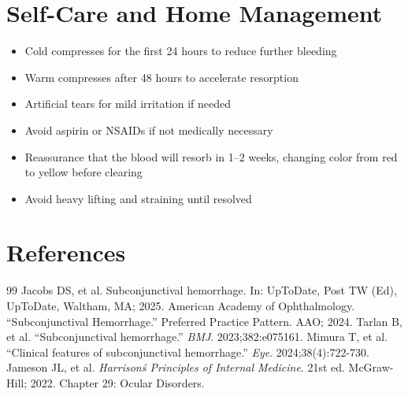 \section*{Self-Care and Home Management}
\begin{itemize}
  \item Cold compresses for the first 24 hours to reduce further bleeding
  \item Warm compresses after 48 hours to accelerate resorption
  \item Artificial tears for mild irritation if needed
  \item Avoid aspirin or NSAIDs if not medically necessary
  \item Reassurance that the blood will resorb in 1--2 weeks, changing color from red to yellow before clearing
  \item Avoid heavy lifting and straining until resolved
\end{itemize}

\section*{References}
\begin{thebibliography}{99}
 Jacobs DS, et al. Subconjunctival hemorrhage. In: UpToDate, Post TW (Ed), UpToDate, Waltham, MA; 2025.
 American Academy of Ophthalmology. ``Subconjunctival Hemorrhage.'' Preferred Practice Pattern. AAO; 2024.
 Tarlan B, et al. ``Subconjunctival hemorrhage.'' \emph{BMJ}. 2023;382:e075161.
 Mimura T, et al. ``Clinical features of subconjunctival hemorrhage.'' \emph{Eye}. 2024;38(4):722-730.
 Jameson JL, et al. \emph{Harrison\'s Principles of Internal Medicine}. 21st ed. McGraw-Hill; 2022. Chapter 29: Ocular Disorders.
\end{thebibliography}
